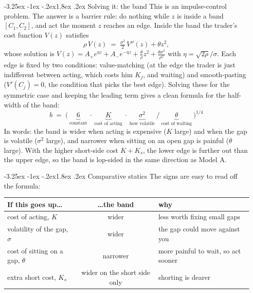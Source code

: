 \documentclass[11pt]{article}
\makeatletter
\renewcommand\section{\@startsection{section}{1}{\z@}%
  {-3.25ex \@plus -1ex \@minus -.2ex}{1.8ex \@plus.2ex}%
  {\normalfont\large\bfseries\color{owblue}}}
\makeatother
\begin{document}
\section{Solving it: the band}
This is an impulse-control problem. The answer is a barrier rule: do nothing while $z$ is inside a band $[C_1,C_2]$, and act the moment $z$ reaches an edge. Inside the band the trader's cost function $V(z)$ satisfies
\[
\rho\,V(z) \;=\; \tfrac{\sigma^2}{2}\,V''(z) + \theta z^2 ,
\]
whose solution is $V(z)=A_{+}e^{\eta z}+A_{-}e^{-\eta z}+\tfrac{\theta}{\rho}z^2+\tfrac{\theta\sigma^2}{\rho^2}$ with $\eta=\sqrt{2\rho}/\sigma$. Each edge is fixed by two conditions: value-matching (at the edge the trader is just indifferent between acting, which costs him $K_j$, and waiting) and smooth-pasting ($V'(C_j)=0$, the condition that picks the best edge). Solving these for the symmetric case and keeping the leading term gives a clean formula for the half-width of the band:
\[
\boxed{\;b \;=\; \Big(\ \underbrace{6}_{\text{constant}}\ \cdot\ \underbrace{K}_{\text{cost of acting}}\ \cdot\ \underbrace{\sigma^2}_{\text{how volatile}}\ /\ \underbrace{\theta}_{\text{cost of waiting}}\ \Big)^{1/4}\;}
\]
In words: the band is wider when acting is expensive ($K$ large) and when the gap is volatile ($\sigma^2$ large), and narrower when sitting on an open gap is painful ($\theta$ large). With the higher short-side cost $K+K_s$, the lower edge is further out than the upper edge, so the band is lop-sided in the same direction as Model A.

\section{Comparative statics}
The signs are easy to read off the formula:
\begin{center}
\small
\begin{tabular}{p{6.5cm} c p{5.5cm}}
\toprule
\textbf{If this goes up\ldots} & \textbf{\ldots the band} & \textbf{why} \\
\midrule
cost of acting, $K$ & wider & less worth fixing small gaps \\
volatility of the gap, $\sigma$ & wider & the gap could move against you \\
cost of sitting on a gap, $\theta$ & narrower & more painful to wait, so act sooner \\
extra short cost, $K_s$ & wider on the short side only & shorting is dearer \\
\bottomrule
\end{tabular}
\end{center}
\end{document}
